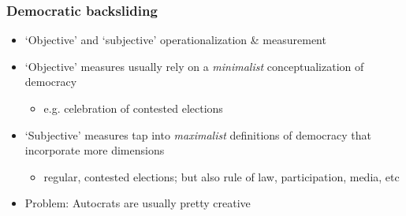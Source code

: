 \documentclass[aspectratio=43]{beamer}
\begin{document}




\begin{frame}
\frametitle{Democratic backsliding}
\centering

\begin{itemize}
  \item `Objective' and `subjective' operationalization \& measurement
  \item `Objective' measures usually rely on a \textit{minimalist} conceptualization of democracy
  \begin{itemize}
    \item e.g. celebration of contested elections
  \end{itemize}
  \item<2-> `Subjective' measures tap into \textit{maximalist} definitions of democracy that incorporate more dimensions
  \begin{itemize}
    \item regular, contested elections; but also rule of law, participation, media, etc
  \end{itemize}
  \item<2-> Problem: Autocrats are usually pretty creative
\end{itemize}

\end{frame}
\end{document}
